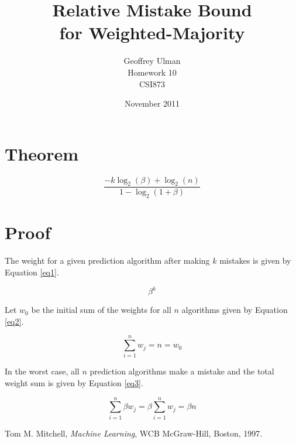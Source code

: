 \documentclass{article}
\begin{document}
\title{Relative Mistake Bound\\
       for Weighted-Majority}
\author{Geoffrey Ulman\\
        Homework 10\\
        CSI873}
\date{November 2011}
\maketitle

\section{Theorem}\label{Theorem}

\begin{equation}
\frac{-k \log _2 \left( \beta \right) + \log _2 \left( n \right)}{1 - \log _2 \left( 1 + \beta \right)}
\end{equation}

\section{Proof}\label{Proof}

The weight for a given prediction algorithm after making \(k\) mistakes is given by Equation \ref{eq1}.

\begin{equation}\label{eq1}
\beta^k
\end{equation}

Let \(w_0\) be the initial sum of the weights for all \(n\) algorithms given by Equation \ref{eq2}.

\begin{equation}\label{eq2}
\sum_{i=1}^{n} w_{j} = n = w_{0}
\end{equation}

In the worst case, all \(n\) prediction algorithms make a mistake and the total weight sum is given by Equation \ref{eq3}.

\begin{equation}\label{eq3}
\sum_{i=1}^{n} \beta w_{j} = \beta \sum_{i=1}^{n} w_{j} = \beta n
\end{equation}



\begin{thebibliography}{9}

  Tom M. Mitchell,
  \emph{Machine Learning},
  WCB McGraw-Hill, Boston,
  1997.

\end{thebibliography}
\end{document}
